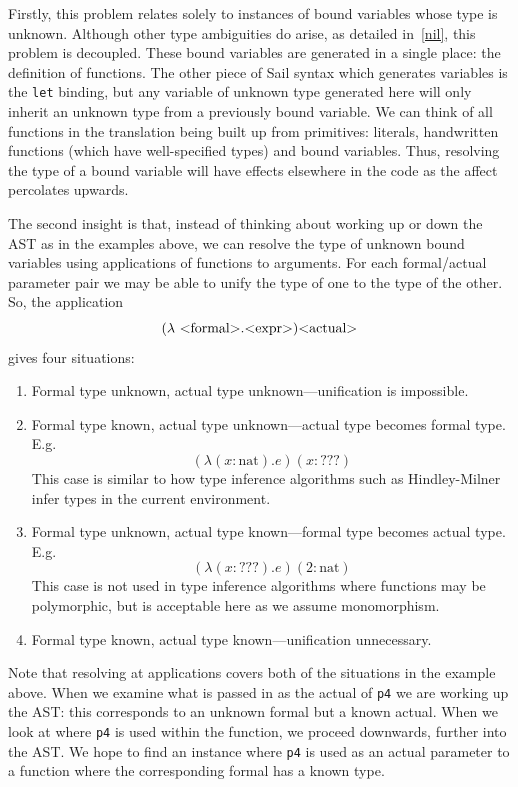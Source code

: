 \documentclass[a4paper,12pt,twoside,openright]{report}
\begin{document}
Firstly, this problem relates solely to instances of bound variables whose type is unknown.  Although other type ambiguities do arise, as detailed in~\ref{nil}, this problem is decoupled.  These bound variables are generated in a single place: the definition of functions.  The other piece of Sail syntax which generates variables is the \texttt{let} binding, but any variable of unknown type generated here will only inherit an unknown type from a previously bound variable.  We can think of all functions in the translation being built up from primitives: literals, handwritten functions (which have well-specified types) and bound variables.  Thus, resolving the type of a bound variable will have effects elsewhere in the code as the affect percolates upwards.

The second insight is that, instead of thinking about working up or down the AST as in the examples above, we can resolve the type of unknown bound variables using applications of functions to arguments.  For each formal/actual parameter pair we may be able to unify the type of one to the type of the other.  So, the application \[(\lambda \textrm{ \textless formal\textgreater } . \textrm{\textless expr\textgreater} ) \textrm{\textless actual\textgreater}\] gives four situations:

\begin{enumerate}
  \item Formal type unknown, actual type unknown---unification is impossible.
  \item Formal type known, actual type unknown---actual type becomes formal type.  E.g.
  \[ (\lambda (x : \textrm{nat}).e)(x : \textrm{???}) \]
  This case is similar to how type inference algorithms such as Hindley-Milner infer types in the current environment.
  \item Formal type unknown, actual type known---formal type becomes actual type.  E.g.
  \[ (\lambda (x : \textrm{???}) . e) (2 : \textrm{nat}) \]
  This case is not used in type inference algorithms where functions may be polymorphic, but is acceptable here as we assume monomorphism.
  \item Formal type known, actual type known---unification unnecessary.
\end{enumerate}

Note that resolving at applications covers both of the situations in the example above.  When we examine what is passed in as the actual of \texttt{p4} we are working up the AST: this corresponds to an unknown formal but a known actual.  When we look at where \texttt{p4} is used within the function, we proceed downwards, further into the AST.  We hope to find an instance where \texttt{p4} is used as an actual parameter to a function where the corresponding formal has a known type.
\end{document}
